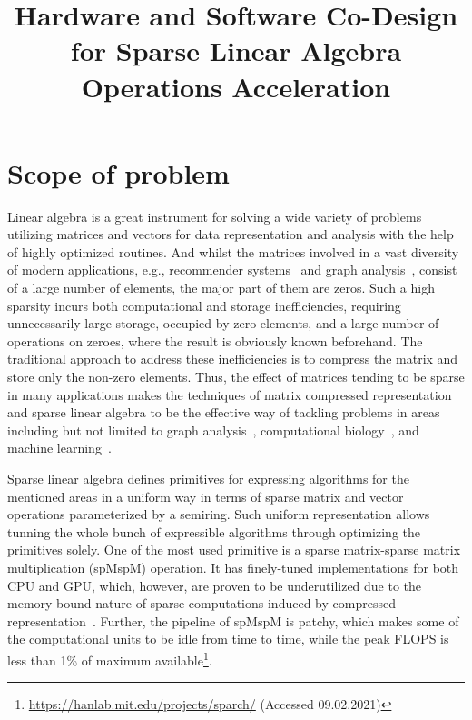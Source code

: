 \documentclass[sigplan,review,anonymous,nonacm]{acmart}\settopmatter{printfolios=true,printccs=false,printacmref=false}
\begin{document}
\title{Hardware and Software Co-Design for Sparse Linear Algebra Operations Acceleration} 


\maketitle

\section{Scope of problem}

Linear algebra is a great instrument for solving a wide variety of problems utilizing matrices and vectors for data representation and analysis with the help of highly optimized routines.
And whilst the matrices involved in a vast diversity of modern applications, e.g., recommender systems~\cite{gupta2020architectural,amazon} and graph analysis~\cite{graph1,graph2}, consist of a large number of elements, the major part of them are zeros.
Such a high sparsity incurs both computational and storage inefficiencies, requiring unnecessarily large storage, occupied by zero elements, and a large number of operations on zeroes, where the result is obviously known beforehand.
The traditional approach to address these inefficiencies is to compress the matrix and store only the non-zero elements. 
Thus, the effect of matrices tending to be sparse in many applications makes the techniques of matrix compressed representation and sparse linear algebra to be the effective way of tackling problems in areas including but not limited to graph analysis~\cite{GAILLA}, computational biology~\cite{compBio}, and machine learning~\cite{Kepner_2017}.


Sparse linear algebra defines primitives for expressing algorithms for the mentioned areas in a uniform way in terms of sparse matrix and vector operations parameterized by a semiring.
Such uniform representation allows tunning the whole bunch of expressible algorithms through optimizing the primitives solely.
One of the most used primitive is a sparse matrix-sparse matrix multiplication (spMspM) operation. 
It has finely-tuned implementations for both CPU and GPU, which, however, are proven to be underutilized due to the memory-bound nature of sparse computations induced by compressed representation~\cite{Florida,leskovec2016snap,Song_2016,zhang2020sparch}.
Further, the pipeline of spMspM is patchy, which makes some of the computational units to be idle from time to time, while the peak FLOPS is less than 1\% of maximum available\footnote{\url{https://hanlab.mit.edu/projects/sparch/} (Accessed 09.02.2021)}. 
\end{document}
